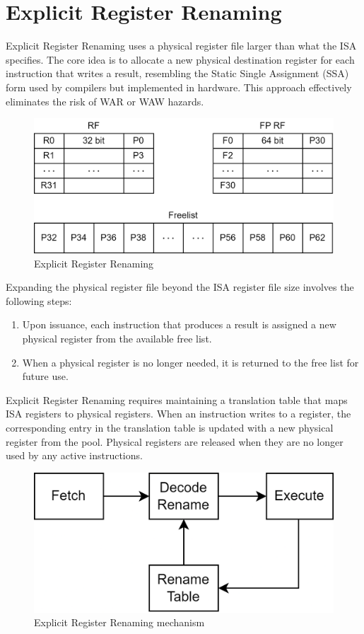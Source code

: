 \section{Explicit Register Renaming}

Explicit Register Renaming uses a physical register file larger than what the ISA specifies. 
The core idea is to allocate a new physical destination register for each instruction that writes a result, resembling the Static Single Assignment (SSA) form used by compilers but implemented in hardware. 
This approach effectively eliminates the risk of WAR or WAW hazards.
\begin{figure}[H]
    \centering
    \includegraphics[width=0.5\linewidth]{images/err.png}
    \caption{Explicit Register Renaming}
\end{figure}
Expanding the physical register file beyond the ISA register file size involves the following steps:
\begin{enumerate}
    \item Upon issuance, each instruction that produces a result is assigned a new physical register from the available free list.
    \item When a physical register is no longer needed, it is returned to the free list for future use.
\end{enumerate}
Explicit Register Renaming requires maintaining a translation table that maps ISA registers to physical registers. 
When an instruction writes to a register, the corresponding entry in the translation table is updated with a new physical register from the pool. 
Physical registers are released when they are no longer used by any active instructions.
\begin{figure}[H]
    \centering
    \includegraphics[width=0.4\linewidth]{images/errm.png}
    \caption{Explicit Register Renaming mechanism}
\end{figure}

